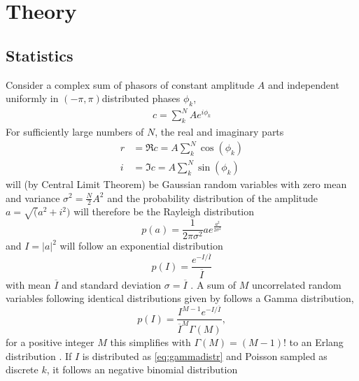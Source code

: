 \chapter{Theory}

\cite{goodman2000,goodman2007,agarwal2013,classen2017,cowley1995,born1980,trigg2005,attwood1999,griffiths2005,agarwal2013,classen2017,loudon2000,mandel1995,hanburry1956,galuber2006,baym1997,zernike1938,rosen96,yabashi2002,singer2013,santra2009,krause1979,trost2020,inoue2019,sorum1987,lajunen04,mpccd,tono2013}


\section{Statistics}
Consider a complex sum of phasors of constant amplitude $A$ and independent uniformly in $(-\pi,\pi)$distributed phases $\phi_k$,
\begin{align}
c=\sum^N_k A e^{i\phi_k}
\end{align}
For sufficiently large numbers of $N$, the real and imaginary parts
\begin{align*}
r&=\Re c =  A \sum^N_k \cos(\phi_k)\\
i&= \Im c =A \sum^N_k \sin(\phi_k)
\end{align*}
will (by Central Limit Theorem) be Gaussian random variables with zero mean and variance $\sigma^2=\frac{N}{2}A^2$ and the probability distribution of the amplitude $a=\sqrt(a^2+i^2)$ will  therefore be the Rayleigh distribution
\begin{equation}
	p(a)=\frac{1}{2\pi\sigma^2} a e^{\frac{a^2}{2\sigma^2}}
\end{equation}
and  $I=\left|a\right|^2$ will  follow an exponential distribution
\begin{equation}
	\label{eq:expdistr}
	p(I)=\frac{ e^{-I/\overline{I}}}{\overline{I}}
\end{equation} 
with mean $\overline{I}$ and standard deviation $\sigma=\overline{I}$  \cite{goodman2000,goodman1976}.
A sum of $M$ uncorrelated random variables following identical distributions given by  follows a Gamma distribution,
\begin{equation}
\label{eq:gammadistr}
p(I)=\frac{I^{M-1} e^{-I/\overline{I}}} {\overline{I}^M \Gamma(M)},
\end{equation}
for a positive integer $M$ this simplifies with $\Gamma(M)=(M-1)!$ to an Erlang distribution  \cite{forbes2010,trost2020}.
If $I$ is  distributed as \ref{eq:gammadistr} and Poisson sampled as discrete $k$, it follows  an negative binomial distribution
